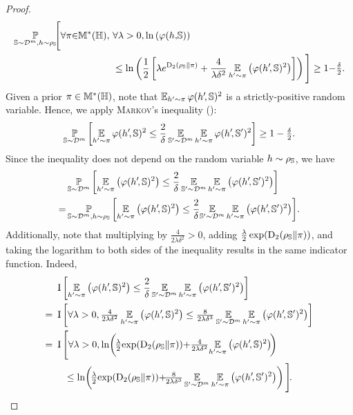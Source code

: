 \begin{noaddcontents}
\begin{proof}
\begin{align}
    \PP_{\S\sim\D^{\m},\h\sim \AQ}\!\!\Bigg[\forall\P{\in}\M^{*}(\H),\ &\forall\lambda>0, \ln\LP\varphi(\h,\!\S)\RP\nonumber\\
    &\le \ln\LP\frac{1}{2}\LB\lambda e^{\Renyi_{2}( \AQ\|\P)}+ \frac{4}{\lambda\delta^2}\EE_{\h'{\sim}\P}\LP\varphi(\h'\!, \S)^2\RP\RB\RP\Bigg]\ge 1{-}\tfrac{\delta}{2}.
    \label{chap:dis-pra:eq:disintegrated-param-proof-1}
\end{align}
Given a prior $\pi\in\mathbb{M}^{*}(\mathbb{H})$, note that $\operatorname*{\mathbb{E}}_{h'{\sim}\pi}\varphi(h'\!, \mathbb{S})^{2}$ is a strictly-positive random variable. 
Hence, we apply \textsc{Markov}'s inequality ():
\begin{align*}
    \operatorname*{\mathbb{P}}_{\mathbb{S}\sim\mathcal{D}^{m}}\left[ \operatorname*{\mathbb{E}}_{h'{\sim}\pi}\varphi(h'\!, \mathbb{S})^2 \le \frac{2}{\delta}\operatorname*{\mathbb{E}}_{\mathbb{S}'{\sim}\mathcal{D}^{m}}\operatorname*{\mathbb{E}}_{h'{\sim}\pi}\varphi(h'\!, \mathbb{S}')^2\right] \ge 1-\tfrac{\delta}{2}.
\end{align*}
Since the inequality does not depend on the random variable $h\sim \rho_{\mathbb{S}}$, we have
\begin{align*}
    &\operatorname*{\mathbb{P}}_{\mathbb{S}\sim\mathcal{D}^{m}}\left[\operatorname*{\mathbb{E}}_{h'{\sim}\pi}\left(\varphi(h'\!, \mathbb{S})^2\right) \le\frac{2}{\delta}\operatorname*{\mathbb{E}}_{\mathbb{S}'{\sim}\mathcal{D}^{m}}\operatorname*{\mathbb{E}}_{h'{\sim}\pi}\left(\varphi(h'\!, \mathbb{S}')^2\right)\right]\\
    = &\operatorname*{\mathbb{P}}_{\mathbb{S}\sim\mathcal{D}^{m},h\sim \rho_{\mathbb{S}}}\left[\operatorname*{\mathbb{E}}_{h'{\sim}\pi}\left(\varphi(h'\!, \mathbb{S})^2\right) \le\frac{2}{\delta}\!\operatorname*{\mathbb{E}}_{\mathbb{S}'{\sim}\mathcal{D}^{m}}\operatorname*{\mathbb{E}}_{h'{\sim}\pi}\left(\varphi(h'\!, \mathbb{S}')^2\right)\right]\!.
\end{align*}
Additionally, note that multiplying by $\frac{4}{2\lambda\delta^2}>0$, adding $\frac{\lambda}{2}\exp(\operatorname{D}_{2}( \rho_{\mathbb{S}}\|\pi))$, and taking the logarithm to both sides of the inequality results in the same indicator function. Indeed,
\allowdisplaybreaks
\begin{align*}
    &\indic\LB\EE_{\h'{\sim}\P}\LP\varphi(\h'\!, \S)^2\RP \le\frac{2}{\delta}\EE_{\S'{\sim}\D^{\m}}\EE_{\h'{\sim}\P}\LP\varphi(\h'\!, \S')^2\RP\RB\\
    =\ &\indic\LB\forall\lambda>0, \tfrac{4}{2\lambda\delta^2}\EE_{\h'{\sim}\P}\LP\varphi(\h'\!, \S)^2\RP \le\tfrac{8}{2\lambda\delta^3}\EE_{\S'{\sim}\D^{\m}}\EE_{\h'{\sim}\P}\LP\varphi(\h'\!, \S')^2\RP\RB\\
    =\ &\indic\Bigg[\forall\lambda>0, \ln\!\LP\!\tfrac{\lambda}{2}\!\exp(\Renyi_{2}( \AQ\|\P)){+}\tfrac{4}{2\lambda\delta^2}\!\EE_{\h'{\sim}\P}\LP\varphi(\h'\!, \S)^2\RP\!\RP\\
    &\hspace{0.3cm}\le \ln\!\LP\!\tfrac{\lambda}{2}\!\exp(\Renyi_{2}( \AQ\|\P)){+}\!\tfrac{8}{2\lambda\delta^3}\EE_{\S'{\sim}\D^{\m}}\EE_{\h'{\sim}\P}\LP\varphi(\h'\!, \S')^2\RP\RP\Bigg]\!.

\end{align*}
\end{proof}
\end{noaddcontents}
